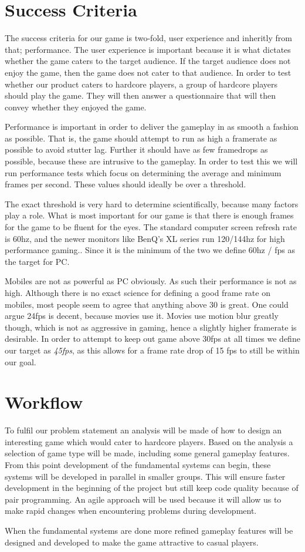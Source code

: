 \section{Success Criteria}\label{successcriteria}
The success criteria for our game is two-fold, user experience and inheritly from that; performance.
The user experience is important because it is what dictates whether the game caters to the target audience.
If the target audience does not enjoy the game, then the game does not cater to that audience.
In order to test whether our product caters to hardcore players, a group of hardcore players should play the game.
They will then answer a questionnaire that will then convey whether they enjoyed the game.

Performance is important in order to deliver the gameplay in as smooth a fashion as possible. That is, the game should attempt to run as high a framerate as possible to avoid stutter lag. Further it should have as few framedrops as possible, because these are intrusive to the gameplay. In order to test this we will run performance tests which focus on determining the average and minimum frames per second. These values should ideally be over a threshold. 

The exact threshold is very hard to determine scientifically, because many factors play a role. What is most important for our game is that there is enough frames for the game to be fluent for the eyes. The standard computer screen refresh rate is 60hz, and the newer monitors like BenQ's XL series run 120/144hz for high performance gaming.\cite{benq}. Since it is the minimum of the two we define 60hz / fps as the target for PC.

Mobiles are not as powerful as PC obviously. As such their performance is not as high. Although there is no exact science for defining a good frame rate on mobiles, most people seem to agree that anything above 30 is great. One could argue 24fps is decent, because movies use it. Movies use motion blur greatly though, which is not as aggressive in gaming, hence a slightly higher framerate is desirable.\cite{mobilefpsone}\cite{mobilefpstwo} 
In order to attempt to keep out game above 30fps at all times we define our target as \emph{45fps}, as this allows for a frame rate drop of 15 fps to still be within our goal.

\section{Workflow}
To fulfil our problem statement an analysis will be made of how to design an interesting game which would cater to hardcore players.
Based on the analysis a selection of game type will be made, including some general gameplay features.
From this point development of the fundamental systems can begin, these systems will be developed in parallel in smaller groups. 
This will ensure faster development in the beginning of the project but still keep code quality because of pair programming.
An agile approach will be used because it will allow us to make rapid changes when encountering problems during development.

When the fundamental systems are done more refined gameplay features will be designed and developed to make the game attractive to casual players.
